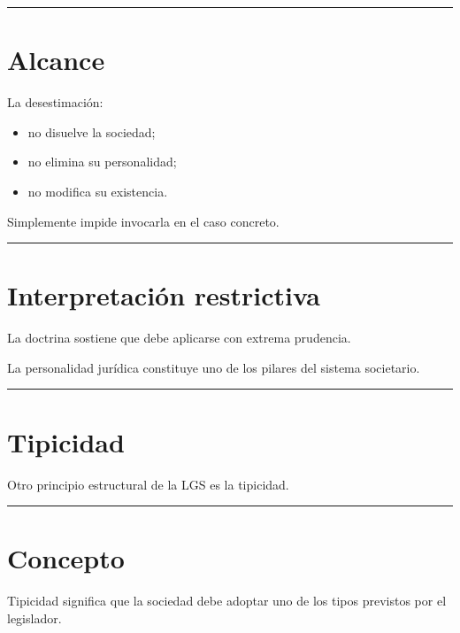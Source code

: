 \documentclass[
  spanish,
  letterpaper,
  DIV=11,
  numbers=noendperiod]{scrartcl}
\providecommand{\tightlist}{%
  \setlength{\itemsep}{0pt}\setlength{\parskip}{0pt}}
\begin{document}
\begin{center}\rule{0.5\linewidth}{0.5pt}\end{center}

\section{Alcance}\label{alcance}

La desestimación:

\begin{itemize}
\tightlist
\item
  no disuelve la sociedad;
\item
  no elimina su personalidad;
\item
  no modifica su existencia.
\end{itemize}

Simplemente impide invocarla en el caso concreto.

\begin{center}\rule{0.5\linewidth}{0.5pt}\end{center}

\section{Interpretación
restrictiva}\label{interpretaciuxf3n-restrictiva}

La doctrina sostiene que debe aplicarse con extrema prudencia.

La personalidad jurídica constituye uno de los pilares del sistema
societario.

\begin{center}\rule{0.5\linewidth}{0.5pt}\end{center}

\section{Tipicidad}\label{tipicidad}

Otro principio estructural de la LGS es la tipicidad.

\begin{center}\rule{0.5\linewidth}{0.5pt}\end{center}

\section{Concepto}\label{concepto}

Tipicidad significa que la sociedad debe adoptar uno de los tipos
previstos por el legislador.
\end{document}
